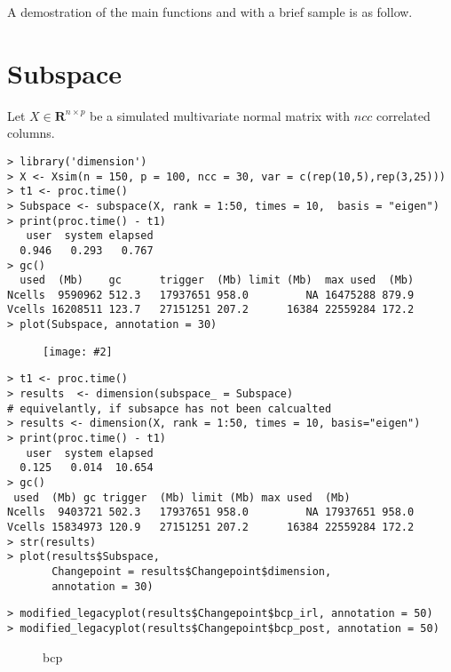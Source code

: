 \documentclass[12pt]{article}
\newcommand{\R}{{\mathbf R}}
\newcommand{\pic}[4]{
\begin{figure}[H]
\centering
\texttt{[image: \#2]}
\caption{#3}
\label{#4}
\end{figure}
}
\newcommand{\sidepic}[8]{
\begin{figure}[H]%
    \centering
    \subfloat[#1]{{\texttt{[image: \#3]} }}%
    \qquad
    \subfloat[#4]{{\texttt{[image: \#6]} }}%
    \caption{#7}%
    \label{#8}%
\end{figure}
}
\begin{document}
A demostration of the main functions and with a brief sample is as follow.

\section{Subspace}

Let $X\in\R^{n\times p}$ be a simulated multivariate normal matrix with $ncc$ correlated columns.

\begin{lstlisting}
> library('dimension')
> X <- Xsim(n = 150, p = 100, ncc = 30, var = c(rep(10,5),rep(3,25)))
> t1 <- proc.time()
> Subspace <- subspace(X, rank = 1:50, times = 10,  basis = "eigen")
> print(proc.time() - t1)
   user  system elapsed
  0.946   0.293   0.767
> gc()
  used  (Mb)    gc      trigger  (Mb) limit (Mb)  max used  (Mb)
Ncells  9590962 512.3   17937651 958.0         NA 16475288 879.9
Vcells 16208511 123.7   27151251 207.2      16384 22559284 172.2
> plot(Subspace, annotation = 30)
\end{lstlisting}
\pic{0.7}{{"Subspace_1_50_Scree"}.pdf}{}{Figure 1}

\begin{lstlisting}
> t1 <- proc.time()
> results  <- dimension(subspace_ = Subspace)
# equivelantly, if subsapce has not been calcualted
> results <- dimension(X, rank = 1:50, times = 10, basis="eigen")
> print(proc.time() - t1)
   user  system elapsed
  0.125   0.014  10.654
> gc()
 used  (Mb) gc trigger  (Mb) limit (Mb) max used  (Mb)
Ncells  9403721 502.3   17937651 958.0         NA 17937651 958.0
Vcells 15834973 120.9   27151251 207.2      16384 22559284 172.2
> str(results)
> plot(results$Subspace,
       Changepoint = results$Changepoint$dimension,
       annotation = 30)
\end{lstlisting}

\begin{lstlisting}
> modified_legacyplot(results$Changepoint$bcp_irl, annotation = 50)
> modified_legacyplot(results$Changepoint$bcp_post, annotation = 50)
\end{lstlisting}
\sidepic{label 1}{7}{{"Subspace_1_50_bcp_irl"}.pdf}{label 2}{7}{{"Subspace_1_50_bcp_post"}.pdf}{bcp}{Figure 3}
\end{document}
